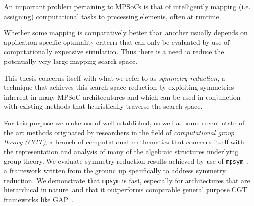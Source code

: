 An important problem pertaining to MPSoCs is that of intelligently mapping
(i.e.  assigning) computational tasks to processing elements, often at runtime.

Whether some mapping is comparatively better than another usually depends on
application specific optimality criteria that can only be evaluated by use of
computationally expensive simulation. Thus there is a need to reduce the
potentially very large mapping search space.

This thesis concerns itself with what we refer to as \textit{symmetry
reduction}, a technique that achieves this search space reduction by exploiting
symmetries inherent in many MPSoC architecutures and which can be used in
conjunction with existing methods that heuristically traverse the search space.

For this purpose we make use of well-established, as well as some recent state
of the art methods originated by researchers in the field of
\textit{computational group theory (CGT)}, a branch of computational
mathematics that concerns itself with the representation and analysis of many
of the algebraic structures underlying group theory.
%
We evaluate symmetry reduction results achieved by use of
\texttt{mpsym}~\cite{mpsym}, a framework written from the ground up
specifically to address symmetry reduction.
%
We demonstrate that \texttt{mpsym} is fast, especially for architectures that
are hierarchical in nature, and that it outperforms comparable general purpose
CGT frameworks like GAP~\cite{GAP4}.
